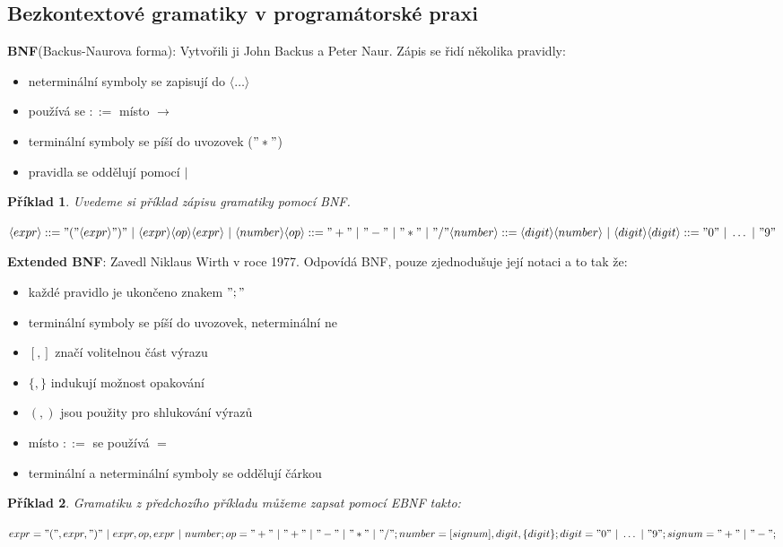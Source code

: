 \documentclass[10pt, a4paper, titlepage]{article}
\theoremstyle{note}
\newtheorem{priklad}{Příklad}
\begin{document}
\subsection{Bezkontextové gramatiky v programátorské praxi}

\textbf{BNF}(Backus-Naurova forma):
Vytvořili ji John Backus a Peter Naur. Zápis se řidí několika pravidly:
\begin{itemize}
\item
neterminální symboly se zapisují do $\langle \ldots \rangle$
\item
používá se $::=$ místo $\rightarrow$
\item
terminální symboly se píší do uvozovek ($"*"$)
\item
pravidla se oddělují pomocí $|$
\end{itemize}

\begin{priklad}
Uvedeme si příklad zápisu gramatiky pomocí BNF.

$\langle expr \rangle ::= "(" \langle expr \rangle ")"\ |\ \langle expr \rangle\langle op \rangle\langle expr \rangle\ |\ \langle number \rangle \\
\langle op \rangle ::= "+"\ |\ "-"\ |\ "*"\ |\ "/" \\
\langle number \rangle ::= \langle digit \rangle \langle number \rangle\ |\ \langle digit \rangle \\
\langle digit \rangle ::= "0"\ |\ \ldots\ |\ "9"$
\end{priklad}

\textbf{Extended BNF}: Zavedl Niklaus Wirth v roce 1977. Odpovídá BNF, pouze zjednodušuje její notaci a to tak že:
\begin{itemize}
\item
každé pravidlo je ukončeno znakem $";"$
\item
terminální symboly se píší do uvozovek, neterminální ne
\item
$[,]$ značí volitelnou část výrazu
\item
$\lbrace,\rbrace$ indukují možnost opakování
\item
$(,)$ jsou použity pro shlukování výrazů
\item
místo $::=$ se používá $=$
\item
terminální a neterminální symboly se oddělují čárkou
\end{itemize}

\begin{priklad}
Gramatiku z předchozího příkladu můžeme zapsat pomocí EBNF takto:

$expr="(",expr,")"\ |\ expr,op,expr\ |\ number;\\
op="+"\ |\ "+"\ |\ "-"\ |\ "*"\ |\ "/";\\
number=[signum],digit,\lbrace digit \rbrace;\\
digit="0"\ |\ \ldots \ |\ "9";\\
signum="+"\ |\ "-";$
\end{priklad}
\end{document}
